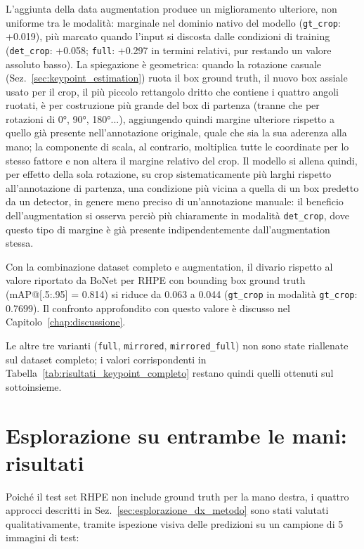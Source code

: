 L'aggiunta della data augmentation produce un miglioramento ulteriore,
non uniforme tra le modalità: marginale nel dominio nativo del modello
(\texttt{gt\_crop}: +0.019), più marcato quando l'input si discosta
dalle condizioni di training (\texttt{det\_crop}: +0.058; \texttt{full}:
+0.297 in termini relativi, pur restando un valore assoluto basso).
La spiegazione è geometrica: quando la rotazione casuale
(Sez.~\ref{sec:keypoint_estimation}) ruota il box ground truth, il
nuovo box assiale usato per il crop, il più piccolo rettangolo dritto
che contiene i quattro angoli ruotati, è per costruzione più grande del
box di partenza (tranne che per rotazioni di 0°, 90°, 180°...),
aggiungendo quindi margine ulteriore rispetto a quello già presente
nell'annotazione originale, quale che sia la sua aderenza alla mano; la
componente di scala, al contrario, moltiplica tutte le coordinate per
lo stesso fattore e non altera il margine relativo del crop. Il modello
si allena quindi, per effetto della sola rotazione, su crop
sistematicamente più larghi rispetto all'annotazione di partenza, una
condizione più vicina a quella di un box predetto da un detector, in
genere meno preciso di un'annotazione manuale: il beneficio
dell'augmentation si osserva perciò più chiaramente in modalità
\texttt{det\_crop}, dove questo tipo di margine è già presente
indipendentemente dall'augmentation stessa.

Con la combinazione dataset completo e augmentation, il divario rispetto
al valore riportato da BoNet per RHPE con bounding box ground truth
(mAP@[.5:.95] = 0.814) si riduce da 0.063 a 0.044 (\texttt{gt\_crop} in
modalità \texttt{gt\_crop}: 0.7699). Il confronto approfondito con
questo valore è discusso nel Capitolo~\ref{chap:discussione}.

Le altre tre varianti (\texttt{full}, \texttt{mirrored},
\texttt{mirrored\_full}) non sono state riallenate sul dataset completo;
i valori corrispondenti in Tabella~\ref{tab:risultati_keypoint_completo}
restano quindi quelli ottenuti sul sottoinsieme.

\section{Esplorazione su entrambe le mani: risultati}
\label{sec:esplorazione_dx}

Poiché il test set RHPE non include ground truth per la mano destra, i
quattro approcci descritti in Sez.~\ref{sec:esplorazione_dx_metodo} sono
stati valutati qualitativamente, tramite ispezione visiva delle
predizioni su un campione di 5 immagini di test:

